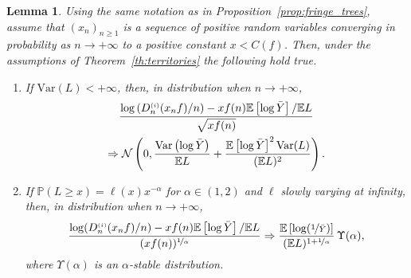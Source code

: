 \documentclass[10pt]{amsart}
\newtheorem{lemm}[theo]{Lemma}\newtheorem{prop}[theo]{Proposition}\newtheorem{coro}[theo]{Corollary}\newtheorem{conj}[theo]{Conjecture}
\theoremstyle{definition}\newtheorem{defi}[theo]{Definition}\newtheorem{rema}[theo]{Remark}\newtheorem{exam}[theo]{Example}\newtheorem{exem}[theo]{Example}\newtheorem{nota}[theo]{Notation}
\newcommand{\sss}{\ensuremath{\scriptscriptstyle}}
\newcommand{\bbP}{\mathbb{P}}
\newcommand{\bbE}{\mathbb{E}}
\newcommand{\clN}{\mathcal{N}}
\newcommand{\Var}{\mathrm{Var}}
\newcommand*{\romanenumi}{\renewcommand*{\theenumi}{\roman{enumi}}}
\begin{document}
\begin{lemm}\label{lem:CLT_random_index}
Using the same notation as in Proposition~\ref{prop:fringe_trees}, assume that $(x_n)_{n\geq 1}$ is a sequence of positive random variables converging in probability as $n\to+\infty$ to a positive constant $x<C(f)$. Then, under the assumptions of Theorem~\ref{th:territories} the following hold true.
\begin{enumerate}\romanenumi
\item\label{lemm3.1.1} If $\Var(L)<+\infty$, then, in distribution when $n\to+\infty$,
\begin{multline*}
\frac{\log \left(D_n^{\sss (i)}(x_n f)/n\right)-xf(n)\bbE\left[\log \bar Y\right]/\bbE L}{\sqrt{xf(n)}}\\
\Rightarrow \clN\left(0, \frac{\Var\left(\log \bar Y\right)}{\bbE L}+\frac{\bbE\left[\log \bar Y\right]^2\Var(L)}{(\bbE L)^2}\right).
\end{multline*}

\item\label{lemm3.1.2} If $\bbP(L\geq x)= \ell(x)x^{-\alpha}$ for $\alpha\in(1,2)$ and $\ell$ slowly varying at infinity, then, in distribution when $n\to+\infty$,
\[
\frac{\log (D_n^{\sss (i)}(x_n f)/n)-xf(n)\bbE\left[\log \bar Y\right]/\bbE L}{(xf(n))^{\nicefrac1\alpha}}
\Rightarrow \frac{\bbE\left[\log(\nicefrac1{\bar Y})\right]}{(\bbE L)^{1+\nicefrac1\alpha}}\,\Upsilon(\alpha),
\]
where $\Upsilon(\alpha)$ is an $\alpha$-stable distribution.
\end{enumerate}
\end{lemm}
\end{document}
